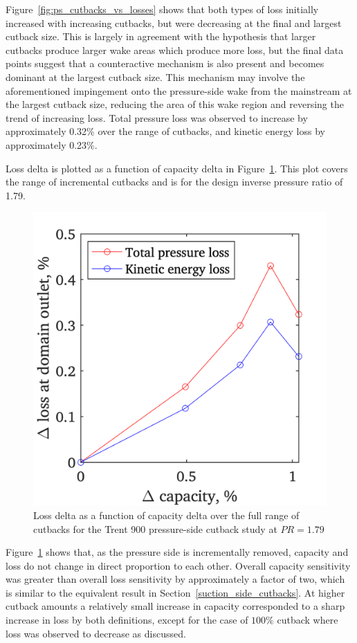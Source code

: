 \documentclass[a4paper, 11pt, oneside]{report}
\begin{document}
Figure~\ref{fig:ps_cutbacks_vs_losses} shows that both types of loss initially increased with increasing cutbacks, but were decreasing at the final and largest cutback size. This is largely in agreement with the hypothesis that larger cutbacks produce larger wake areas which produce more loss, but the final data points suggest that a counteractive mechanism is also present and becomes dominant at the largest cutback size. This mechanism may involve the aforementioned impingement onto the pressure-side wake from the mainstream at the largest cutback size, reducing the area of this wake region and reversing the trend of increasing loss. Total pressure loss was observed to increase by approximately 0.32\% over the range of cutbacks, and kinetic energy loss by approximately 0.23\%.

Loss delta is plotted as a function of capacity delta in Figure~\ref{fig:ps_capacities_vs_losses}. This plot covers the range of incremental cutbacks and is for the design inverse pressure ratio of 1.79.

\begin{figure}[H]
	\centering
	\includegraphics[width=.45\textwidth]{figs/ps_capacities_vs_losses.png}
	\caption{Loss delta as a function of capacity delta over the full range of cutbacks for the Trent 900 pressure-side cutback study at $PR=1.79$}
    \label{fig:ps_capacities_vs_losses}
\end{figure}

\newpage
Figure~\ref{fig:ps_capacities_vs_losses} shows that, as the pressure side is incrementally removed, capacity and loss do not change in direct proportion to each other. Overall capacity sensitivity was greater than overall loss sensitivity by approximately a factor of two, which is similar to the equivalent result in Section~\ref{suction_side_cutbacks}. At higher cutback amounts a relatively small increase in capacity corresponded to a sharp increase in loss by both definitions, except for the case of $100\%$ cutback where loss was observed to decrease as discussed.
\end{document}

